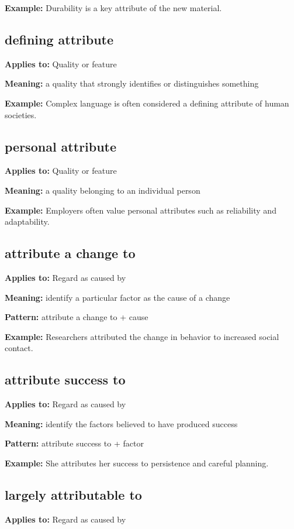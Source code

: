 \documentclass[11pt]{article}
\begin{document}
\textbf{Example:} Durability is a key attribute of the new material.

\subsection{defining attribute}
\textbf{Applies to:} Quality or feature

\textbf{Meaning:} a quality that strongly identifies or distinguishes something

\textbf{Example:} Complex language is often considered a defining attribute of human societies.

\subsection{personal attribute}
\textbf{Applies to:} Quality or feature

\textbf{Meaning:} a quality belonging to an individual person

\textbf{Example:} Employers often value personal attributes such as reliability and adaptability.

\subsection{attribute a change to}
\textbf{Applies to:} Regard as caused by

\textbf{Meaning:} identify a particular factor as the cause of a change

\textbf{Pattern:} attribute a change to + cause

\textbf{Example:} Researchers attributed the change in behavior to increased social contact.

\subsection{attribute success to}
\textbf{Applies to:} Regard as caused by

\textbf{Meaning:} identify the factors believed to have produced success

\textbf{Pattern:} attribute success to + factor

\textbf{Example:} She attributes her success to persistence and careful planning.

\subsection{largely attributable to}
\textbf{Applies to:} Regard as caused by
\end{document}
